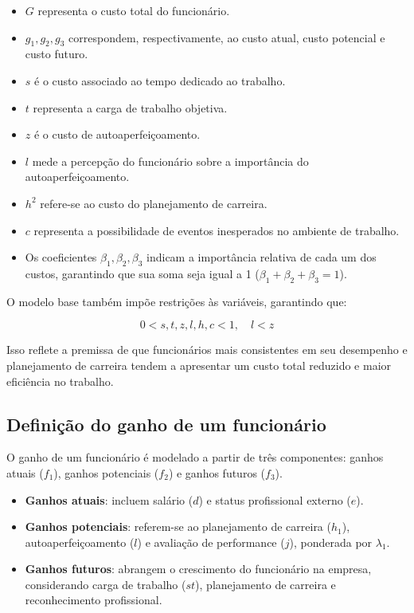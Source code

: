 \documentclass[
	article,			%
	11pt,				%
	oneside,			%
	a4paper,			%
	english,			%
	brazil,				%
	sumario=tradicional
	]{abntex2}
\begin{document}
\begin{itemize}
    \item \( G \) representa o custo total do funcionário.
    \item \( g_1, g_2, g_3 \) correspondem, respectivamente, ao custo atual, custo potencial e custo futuro.
    \item \( s \) é o custo associado ao tempo dedicado ao trabalho.
    \item \( t \) representa a carga de trabalho objetiva.
    \item \( z \) é o custo de autoaperfeiçoamento.
    \item \( l \) mede a percepção do funcionário sobre a importância do autoaperfeiçoamento.
    \item \( h^2 \) refere-se ao custo do planejamento de carreira.
    \item \( c \) representa a possibilidade de eventos inesperados no ambiente de trabalho.
    \item Os coeficientes \( \beta_1, \beta_2, \beta_3 \) indicam a importância relativa de cada um dos custos, garantindo que sua soma seja igual a 1 (\( \beta_1 + \beta_2 + \beta_3 = 1 \)).
\end{itemize}

O modelo base também impõe restrições às variáveis, garantindo que:

\[
0 < s, t, z, l, h, c < 1, \quad l < z
\]

Isso reflete a premissa de que funcionários mais consistentes em seu desempenho e planejamento de carreira tendem a apresentar um custo total reduzido e maior eficiência no trabalho.

\subsection{Definição do ganho de um funcionário}
O ganho de um funcionário é modelado a partir de três componentes: ganhos atuais (\( f_1 \)), ganhos potenciais (\( f_2 \)) e ganhos futuros (\( f_3 \)).

\begin{itemize}
    \item \textbf{Ganhos atuais}: incluem salário (\( d \)) e status profissional externo (\( e \)).
    \item \textbf{Ganhos potenciais}: referem-se ao planejamento de carreira (\( h_1 \)), autoaperfeiçoamento (\( l \)) e avaliação de performance (\( j \)), ponderada por \( \lambda_1 \).
    \item \textbf{Ganhos futuros}: abrangem o crescimento do funcionário na empresa, considerando carga de trabalho (\( st \)), planejamento de carreira e reconhecimento profissional.
\end{itemize}
\end{document}
